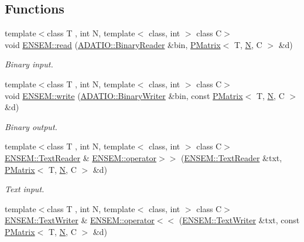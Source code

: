 \subsection*{Functions}
\begin{DoxyCompactItemize}
\item 
{\footnotesize template$<$class T , int N, template$<$ class, int $>$ class C$>$ }\\void \mbox{\hyperlink{group__primmatrix_ga95daf5fb6c2f089f11774d123f8795d5}{E\+N\+S\+E\+M\+::read}} (\mbox{\hyperlink{classADATIO_1_1BinaryReader}{A\+D\+A\+T\+I\+O\+::\+Binary\+Reader}} \&bin, \mbox{\hyperlink{classENSEM_1_1PMatrix}{P\+Matrix}}$<$ T, \mbox{\hyperlink{adat__devel_2lib_2hadron_2operator__name__util_8cc_a7722c8ecbb62d99aee7ce68b1752f337}{N}}, C $>$ \&d)
\begin{DoxyCompactList}\small\item\em Binary input. \end{DoxyCompactList}\item 
{\footnotesize template$<$class T , int N, template$<$ class, int $>$ class C$>$ }\\void \mbox{\hyperlink{group__primmatrix_ga7255316b449512a4081c99a02e485e4c}{E\+N\+S\+E\+M\+::write}} (\mbox{\hyperlink{classADATIO_1_1BinaryWriter}{A\+D\+A\+T\+I\+O\+::\+Binary\+Writer}} \&bin, const \mbox{\hyperlink{classENSEM_1_1PMatrix}{P\+Matrix}}$<$ T, \mbox{\hyperlink{adat__devel_2lib_2hadron_2operator__name__util_8cc_a7722c8ecbb62d99aee7ce68b1752f337}{N}}, C $>$ \&d)
\begin{DoxyCompactList}\small\item\em Binary output. \end{DoxyCompactList}\item 
{\footnotesize template$<$class T , int N, template$<$ class, int $>$ class C$>$ }\\\mbox{\hyperlink{classENSEM_1_1TextReader}{E\+N\+S\+E\+M\+::\+Text\+Reader}} \& \mbox{\hyperlink{group__primmatrix_ga94a915150324a06d2d330515358811f2}{E\+N\+S\+E\+M\+::operator$>$$>$}} (\mbox{\hyperlink{classENSEM_1_1TextReader}{E\+N\+S\+E\+M\+::\+Text\+Reader}} \&txt, \mbox{\hyperlink{classENSEM_1_1PMatrix}{P\+Matrix}}$<$ T, \mbox{\hyperlink{adat__devel_2lib_2hadron_2operator__name__util_8cc_a7722c8ecbb62d99aee7ce68b1752f337}{N}}, C $>$ \&d)
\begin{DoxyCompactList}\small\item\em Text input. \end{DoxyCompactList}\item 
{\footnotesize template$<$class T , int N, template$<$ class, int $>$ class C$>$ }\\\mbox{\hyperlink{classENSEM_1_1TextWriter}{E\+N\+S\+E\+M\+::\+Text\+Writer}} \& \mbox{\hyperlink{group__primmatrix_gafa0f739db2eca6b8b80d632ce81f78b7}{E\+N\+S\+E\+M\+::operator$<$$<$}} (\mbox{\hyperlink{classENSEM_1_1TextWriter}{E\+N\+S\+E\+M\+::\+Text\+Writer}} \&txt, const \mbox{\hyperlink{classENSEM_1_1PMatrix}{P\+Matrix}}$<$ T, \mbox{\hyperlink{adat__devel_2lib_2hadron_2operator__name__util_8cc_a7722c8ecbb62d99aee7ce68b1752f337}{N}}, C $>$ \&d)

\end{DoxyCompactItemize}
